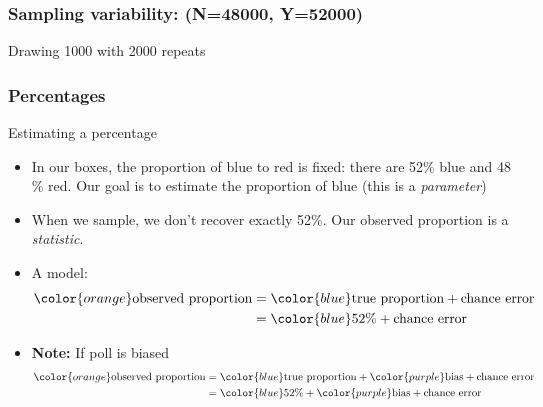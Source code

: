 \documentclass[handout]{beamer}
\begin{document}


   \begin{frame}
   \frametitle{Sampling variability: (N=48000, Y=52000)}
   \begin{center}
   \end{center}
   Drawing 1000 with 2000 repeats
   \end{frame}


   \begin{frame} \frametitle{Percentages}

   \begin{block}
   {Estimating a percentage}
   \begin{itemize}
   \item In our boxes, the proportion of blue to red is fixed: there
   are 52\% blue and 48 \% red. Our goal is to estimate
   the proportion of blue (this is a {\em \color{blue} parameter})
   \item When we sample, we don't recover exactly 52\%. Our observed
   proportion is a {\em \color{orange} statistic}.
   \item A model:
   $$
   \begin{aligned}
   {\color{orange} \text{observed proportion}} &= {\color{blue} \text{true proportion}} + \text{chance error} \\
   &= {\color{blue} 52\%} + \text{chance error} \\
   \end{aligned}
   $$
   \item {\bf Note:} If poll is biased
   $$
   \begin{aligned}
   {\color{orange} \text{observed proportion}} &= {\color{blue} \text{true proportion}} + {\color{purple} \text{bias}} + \text{chance error} \\
   &= {\color{blue} 52\%} + {\color{purple} \text{bias}} + \text{chance error} \\
   \end{aligned}
   $$
   \end{itemize}
   \end{block}
   \end{frame}
\end{document}
